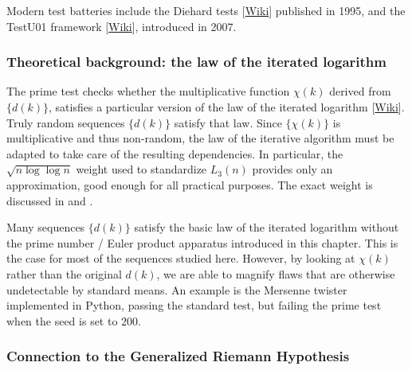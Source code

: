 \documentclass[oneside,10pt]{book}
\begin{document}
Modern test batteries
 include the \textcolor{index}{Diehard tests} [\href{https://en.wikipedia.org/wiki/Diehard_tests}{Wiki}] published in 1995, and the
 \textcolor{index}{TestU01} framework [\href{https://en.wikipedia.org/wiki/TestU01}{Wiki}], introduced in 2007.



\subsubsection{Theoretical background: the law of the iterated logarithm}\label{iterlawsd}

The prime test checks whether the multiplicative function $\chi(k)$ derived from $\{d(k)\}$, satisfies a particular version of the
 \textcolor{index}{law of the iterated logarithm} [\href{https://en.wikipedia.org/wiki/Law_of_the_iterated_logarithm}{Wiki}]. Truly random sequences $\{d(k)\}$ satisfy that law. Since $\{\chi(k)\}$ is multiplicative and thus non-random, the law of the iterative algorithm
 must be adapted to take care of the resulting dependencies. In particular, the $\sqrt{n\log\log n}$ weight used to standardize
  $L_3(n)$  provides only an approximation, good enough for all practical purposes. The exact weight is discussed in
  \cite{harper2020} and \cite{yukkam2013}.

Many sequences $\{d(k)\}$ satisfy the basic law of the iterated logarithm without the prime number / Euler product apparatus introduced
 in this chapter. This is the case for most of the sequences studied here. However, by looking at $\chi(k)$ rather than the original
 $d(k)$, we are able to magnify flaws that are otherwise undetectable by standard means. An example is the Mersenne twister
  implemented in Python, passing the standard test, but failing the prime test when the seed is set to $200$.

\subsubsection{Connection to the Generalized Riemann Hypothesis}\label{iurhty}
\end{document}

